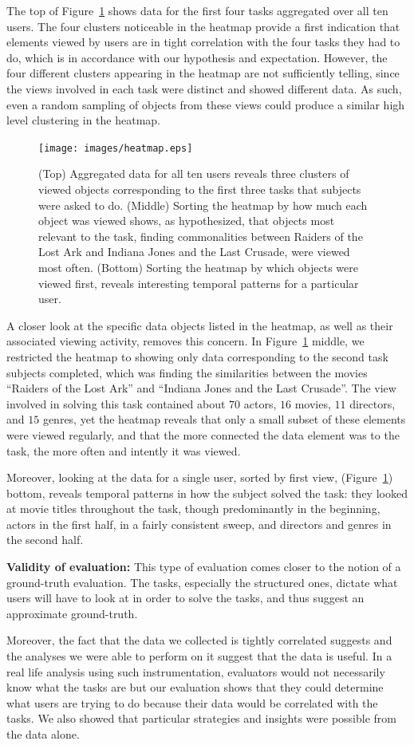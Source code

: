 The top of Figure~\ref{fig:heatmap} shows data for the first four tasks aggregated over all ten users. The four clusters noticeable in the heatmap provide a first indication that elements viewed by users are in tight correlation with the four tasks they had to do, which is in accordance with our hypothesis and expectation. However, the four different clusters appearing in the heatmap are not sufficiently telling, since the views involved in each task were distinct and showed different data. As such, even a random sampling of objects from these views could produce a similar high level clustering in the heatmap. 

\begin{figure}[htb]
  \centering
  \texttt{[image: images/heatmap.eps]}
  \caption{(Top) Aggregated data for all ten users reveals three clusters of viewed objects corresponding to the first three tasks that subjects were asked to do. (Middle) Sorting the heatmap by how much each object was viewed shows, as hypothesized, that objects most relevant to the task, finding commonalities between Raiders of the Lost Ark and Indiana Jones and the Last Crusade, were viewed most often. (Bottom) Sorting the heatmap by which objects were viewed first, reveals interesting temporal patterns for a particular user. }
	\label{fig:heatmap}
\end{figure}

A closer look at the specific data objects listed in the heatmap, as well as their associated viewing activity, removes this concern. In Figure~\ref{fig:heatmap} middle, we restricted the heatmap to showing only data corresponding to the second task subjects completed, which was finding the similarities between the movies ``Raiders of the Lost Ark'' and ``Indiana Jones and the Last Crusade''. The view involved in solving this task contained about $70$ actors, $16$ movies, $11$ directors, and $15$ genres, yet the heatmap reveals that only a small subset of these elements were viewed regularly, and that the more connected the data element was to the task, the more often and intently it was viewed.

Moreover, looking at the data for a single user, sorted by first view, (Figure~\ref{fig:heatmap}) bottom, reveals temporal patterns in how the subject solved the task: they looked at movie titles throughout the task, though predominantly in the beginning, actors in the first half, in a fairly consistent sweep, and directors and genres in the second half. 

\textbf{Validity of evaluation:} This type of evaluation comes closer to the notion of a ground-truth evaluation. The tasks, especially the structured ones, dictate what users will have to look at in order to solve the tasks, and thus suggest an approximate ground-truth. 

Moreover, the fact that the data we collected is tightly correlated suggests and the analyses we were able to perform on it suggest that the data is useful. In a real life analysis using such instrumentation, evaluators would not necessarily know what the tasks are but our evaluation shows that they could determine what users are trying to do because their data would be correlated with the tasks. We also showed that particular strategies and insights were possible from the data alone. 
